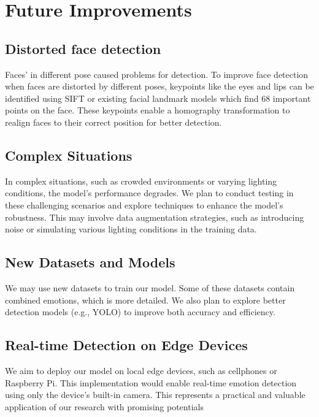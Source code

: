 \section{Future Improvements}
\subsection{Distorted face detection}
Faces' in different pose caused problems for detection. To improve face detection when faces are distorted by different poses, keypoints like the eyes and lips can be identified using SIFT or existing facial landmark models which find 68 important points on the face. These keypoints enable a homography transformation to realign faces to their correct position for better detection.

\subsection{Complex Situations}
In complex situations, such as crowded environments or varying lighting conditions, the model's performance degrades. We plan to conduct  testing in these challenging scenarios and explore techniques to enhance the model's robustness. This may involve data augmentation strategies, such as introducing noise or simulating various lighting conditions in the training data.

\subsection{New Datasets and Models}
We may use new datasets to train our model. Some of these datasets contain combined emotions, which is more detailed. We also plan to explore better detection models (e.g., YOLO) to improve both accuracy and efficiency.

\subsection{Real-time Detection on Edge Devices}
We aim to deploy our model on local edge devices, such as cellphones or Raspberry Pi. This implementation would enable real-time emotion detection using only the device's built-in camera. This represents a practical and valuable application of our research with promising potentials
